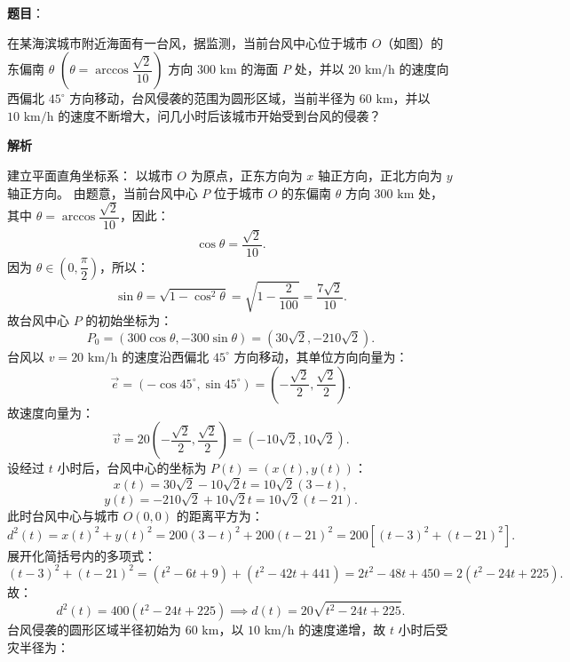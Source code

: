 \begin{answer}

\textbf{题目}：

在某海滨城市附近海面有一台风，据监测，当前台风中心位于城市 $O$（如图）的东偏南 $\theta$ $\left(\theta = \arccos\dfrac{\sqrt{2}}{10}\right)$ 方向 $300\text{ km}$ 的海面 $P$ 处，并以 $20\text{ km/h}$ 的速度向西偏北 $45^\circ$ 方向移动，台风侵袭的范围为圆形区域，当前半径为 $60\text{ km}$，并以 $10\text{ km/h}$ 的速度不断增大，问几小时后该城市开始受到台风的侵袭？
\nopagebreak[4]
\begin{center}\end{center}
\nopagebreak[4]
\textbf{解析}

建立平面直角坐标系：
以城市 $O$ 为原点，正东方向为 $x$ 轴正方向，正北方向为 $y$ 轴正方向。
由题意，当前台风中心 $P$ 位于城市 $O$ 的东偏南 $\theta$ 方向 $300\text{ km}$ 处，其中 $\theta = \arccos\dfrac{\sqrt{2}}{10}$，因此：
\nopagebreak[4]
\[\cos\theta = \frac{\sqrt{2}}{10}.\]
因为 $\theta \in \left(0, \dfrac{\pi}{2}\right)$，所以：
\nopagebreak[4]
\[\sin\theta = \sqrt{1 - \cos^2\theta} = \sqrt{1 - \frac{2}{100}} = \frac{7\sqrt{2}}{10}.\]
故台风中心 $P$ 的初始坐标为：
\nopagebreak[4]
\[P_0 = (300\cos\theta, -300\sin\theta) = (30\sqrt{2}, -210\sqrt{2}).\]
台风以 $v = 20\text{ km/h}$ 的速度沿西偏北 $45^\circ$ 方向移动，其单位方向向量为：
\nopagebreak[4]
\[\vec{e} = (-\cos 45^\circ, \sin 45^\circ) = \left(-\frac{\sqrt{2}}{2}, \frac{\sqrt{2}}{2}\right).\]
故速度向量为：
\nopagebreak[4]
\[\vec{v} = 20 \left(-\frac{\sqrt{2}}{2}, \frac{\sqrt{2}}{2}\right) = (-10\sqrt{2}, 10\sqrt{2}).\]
设经过 $t$ 小时后，台风中心的坐标为 $P(t) = (x(t), y(t))$：
\nopagebreak[4]
\[x(t) = 30\sqrt{2} - 10\sqrt{2}t = 10\sqrt{2}(3 - t),\]
\nopagebreak[4]
\[y(t) = -210\sqrt{2} + 10\sqrt{2}t = 10\sqrt{2}(t - 21).\]
此时台风中心与城市 $O(0, 0)$ 的距离平方为：
\nopagebreak[4]
\[d^2(t) = x(t)^2 + y(t)^2 = 200(3 - t)^2 + 200(t - 21)^2 = 200[(t - 3)^2 + (t - 21)^2].\]
展开化简括号内的多项式：
\nopagebreak[4]
\[(t - 3)^2 + (t - 21)^2 = (t^2 - 6t + 9) + (t^2 - 42t + 441) = 2t^2 - 48t + 450 = 2(t^2 - 24t + 225).\]
故：
\nopagebreak[4]
\[d^2(t) = 400(t^2 - 24t + 225) \implies d(t) = 20\sqrt{t^2 - 24t + 225}.\]
台风侵袭的圆形区域半径初始为 $60\text{ km}$，以 $10\text{ km/h}$ 的速度递增，故 $t$ 小时后受灾半径为：

\end{answer}
